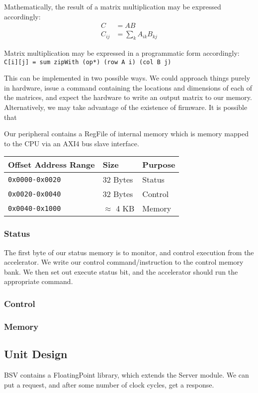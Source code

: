 \documentclass[a4paper,9pt]{report}
\begin{document}
Mathematically, the result of a matrix multiplication may be expressed
accordingly:
\begin{align*}
  C &= AB \\
  C_{ij} &= \sum_k A_{ik}B_{kj}
\end{align*}

Matrix multiplication may be expressed in a programmatic form accordingly:
\texttt{C[i][j] = sum zipWith (op*) (row A i) (col B j)}

This can be implemented in two possible ways.
We could approach things purely in hardware, issue a command containing the
locations and dimensions of each of the matrices, and expect the hardware to
write an output matrix to our memory.
Alternatively, we may take advantage of the existence of firmware. It is
possible that 

Our peripheral contains a RegFile of internal memory which is memory mapped to
the CPU via an AXI4 bus slave interface.

\begin{tabular}{lll}
  \toprule
  Offset Address Range & Size & Purpose \\
  \midrule
  \texttt{0x0000-0x0020} & 32 Bytes & Status \\
  \texttt{0x0020-0x0040} & 32 Bytes & Control \\
  \texttt{0x0040-0x1000} & $\approx$ 4 KB & Memory \\
  \bottomrule
\end{tabular}

\subsubsection{Status}
The first byte of our status memory is to monitor, and control execution from
the accelerator.
We write our control command/instruction to the control memory bank. We then set out
execute status bit, and the accelerator should run the appropriate command.

\subsubsection{Control}

\subsubsection{Memory}


\subsection{Unit Design} 
BSV contains a FloatingPoint library, which extends the Server module.
We can put a request, and after some number of clock cycles, get a response.
\end{document}
